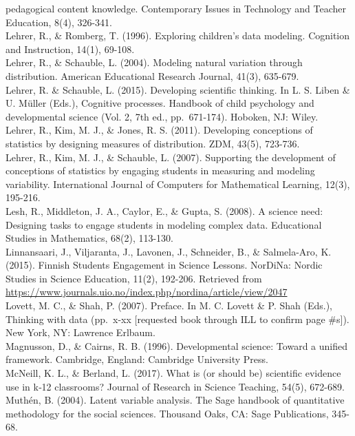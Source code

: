 \documentclass[]{msu-thesis}
\theoremstyle{definition}
\theoremstyle{definition}
\theoremstyle{definition}
\theoremstyle{remark}
\begin{document}
pedagogical content knowledge. Contemporary Issues in Technology and
Teacher Education, 8(4), 326-341.\\
Lehrer, R., \& Romberg, T. (1996). Exploring children's data modeling.
Cognition and Instruction, 14(1), 69-108.\\
Lehrer, R., \& Schauble, L. (2004). Modeling natural variation through
distribution. American Educational Research Journal, 41(3), 635-679.\\
Lehrer, R. \& Schauble, L. (2015). Developing scientific thinking. In L.
S. Liben \& U. Müller (Eds.), Cognitive processes. Handbook of child
psychology and developmental science (Vol. 2, 7th ed., pp.~671-174).
Hoboken, NJ: Wiley.\\
Lehrer, R., Kim, M. J., \& Jones, R. S. (2011). Developing conceptions
of statistics by designing measures of distribution. ZDM, 43(5),
723-736.\\
Lehrer, R., Kim, M. J., \& Schauble, L. (2007). Supporting the
development of conceptions of statistics by engaging students in
measuring and modeling variability. International Journal of Computers
for Mathematical Learning, 12(3), 195-216.\\
Lesh, R., Middleton, J. A., Caylor, E., \& Gupta, S. (2008). A science
need: Designing tasks to engage students in modeling complex data.
Educational Studies in Mathematics, 68(2), 113-130.\\
Linnansaari, J., Viljaranta, J., Lavonen, J., Schneider, B., \&
Salmela-Aro, K. (2015). Finnish Students Engagement in Science Lessons.
NorDiNa: Nordic Studies in Science Education, 11(2), 192-206. Retrieved
from
\url{https://www.journals.uio.no/index.php/nordina/article/view/2047}\\
Lovett, M. C., \& Shah, P. (2007). Preface. In M. C. Lovett \& P. Shah
(Eds.), Thinking with data (pp.~x-xx {[}requested book through ILL to
confirm page \#s{]}). New York, NY: Lawrence Erlbaum.\\
Magnusson, D., \& Cairns, R. B. (1996). Developmental science: Toward a
unified framework. Cambridge, England: Cambridge University Press.\\
McNeill, K. L., \& Berland, L. (2017). What is (or should be) scientific
evidence use in k‐12 classrooms? Journal of Research in Science
Teaching, 54(5), 672-689.\\
Muthén, B. (2004). Latent variable analysis. The Sage handbook of
quantitative methodology for the social sciences. Thousand Oaks, CA:
Sage Publications, 345-68.\\
\end{document}

